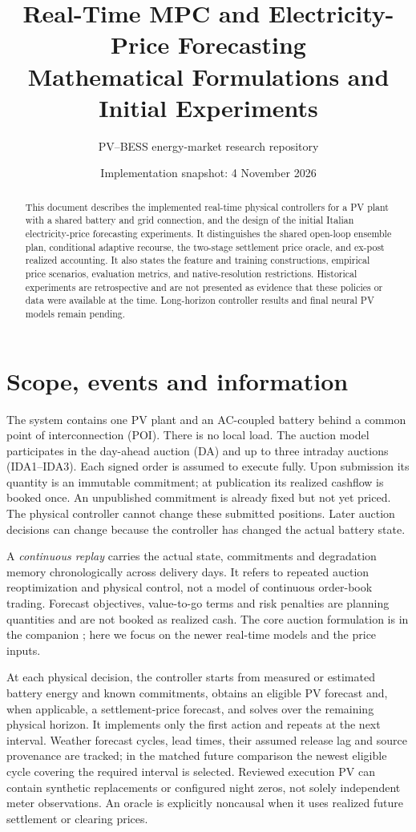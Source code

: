 \documentclass[11pt,a4paper]{article}
\title{Real-Time MPC and Electricity-Price Forecasting\\Mathematical Formulations and Initial Experiments}
\author{PV--BESS energy-market research repository}
\date{Implementation snapshot: 4 November 2026}
\begin{document}
\maketitle
\begin{abstract}
This document describes the implemented real-time physical controllers for a
PV plant with a shared battery and grid connection, and the design of the initial
Italian electricity-price forecasting experiments. It distinguishes the shared
open-loop ensemble plan, conditional adaptive recourse, the two-stage settlement
price oracle, and ex-post realized accounting. It also states the feature and
training constructions, empirical price scenarios, evaluation metrics, and
native-resolution restrictions. Historical experiments are retrospective and
are not presented as evidence that these policies or data were available at the
time. Long-horizon controller results and final neural PV models remain pending.
\end{abstract}
\tableofcontents
\newpage

\section{Scope, events and information}
The system contains one PV plant and an AC-coupled battery behind a common point
of interconnection (POI). There is no local load. The auction model participates
in the day-ahead auction (DA) and up to three intraday auctions (IDA1--IDA3).
Each signed order is assumed to execute fully. Upon submission its quantity is
an immutable commitment; at publication its realized cashflow is booked once.
An unpublished commitment is already fixed but not yet priced. The physical
controller cannot change these submitted positions. Later auction decisions can
change because the controller has changed the actual battery state.

A \emph{continuous replay} carries the actual state, commitments and degradation
memory chronologically across delivery days. It refers to repeated auction
reoptimization and physical control, not a model of continuous order-book
trading. Forecast objectives, value-to-go terms and risk penalties are planning
quantities and are not booked as realized cash. The core auction formulation is
in the companion ; here we focus on the newer
real-time models and the price inputs.

At each physical decision, the controller starts from measured or estimated
battery energy and known commitments, obtains an eligible PV forecast and,
when applicable, a settlement-price forecast, and solves over the remaining
physical horizon. It implements only the first action and repeats at the next
interval. Weather forecast cycles, lead times, their assumed release lag and
source provenance are tracked; in the matched future comparison the newest
eligible cycle covering the required interval is selected. Reviewed execution
PV can contain synthetic replacements or configured night zeros, not solely
independent meter observations. An oracle is explicitly noncausal when it uses
realized future settlement or clearing prices.
\end{document}
